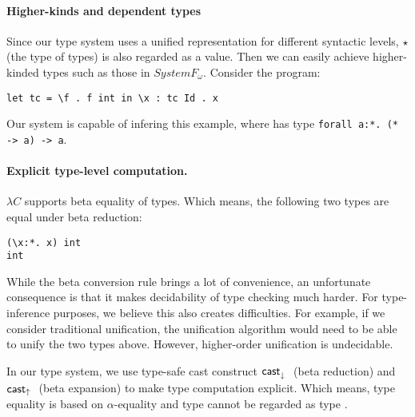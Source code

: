 \paragraph{Higher-kinds and dependent types} 
Since our type system uses a unified representation for different
syntactic levels, $\star$ (the type of types) is also regarded as a
value. Then we can easily achieve higher-kinded types such as those 
in $System F_{\omega}$.  Consider the program:

\begin{lstlisting}
let tc = \f . f int in \x : tc Id . x
\end{lstlisting}

Our system is capable of infering this example, where  has
type \lstinline{forall a:*. (* -> a) -> a}.

\begin{comment}
Furthermore, again due to the unified representation we can have 
some simple dependently typed programs such as:

\begin{lstlisting}
let tc = \f . f 0 in \x : tc Id . x
\end{lstlisting}
\end{comment}

\paragraph{Explicit type-level computation.} $\lambda C$ supports beta
equality of types. Which means, the following two types are equal
under beta reduction:

\begin{lstlisting}
(\x:*. x) int
int
\end{lstlisting}

While the beta conversion rule brings a lot of convenience, an
unfortunate consequence is that it makes decidability of type
checking much harder. For type-inference purposes, we believe
this also creates difficulties. For example, if we consider
traditional unification, the unification algorithm would need
to be able to unify the two types above. However, higher-order
unification is undecidable.

In our type system, we use type-safe cast construct $\mathsf{cast}_\downarrow^{}~$ (beta
reduction) and $\mathsf{cast}_\uparrow~$ (beta expansion) to make type computation
explicit. Which means, type equality is based on $\alpha$-equality and
type  cannot be regarded as type .

